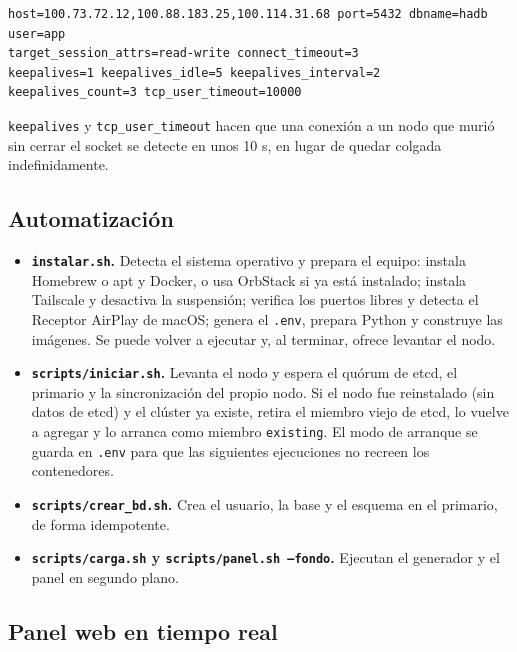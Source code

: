 \documentclass[11pt,a4paper]{article}
\newcommand{\cod}[1]{\texttt{#1}}
\begin{document}
\begin{lstlisting}
host=100.73.72.12,100.88.183.25,100.114.31.68 port=5432 dbname=hadb user=app
target_session_attrs=read-write connect_timeout=3
keepalives=1 keepalives_idle=5 keepalives_interval=2 keepalives_count=3 tcp_user_timeout=10000
\end{lstlisting}

\cod{keepalives} y \cod{tcp\_user\_timeout} hacen que una conexión a un nodo que murió sin cerrar el socket se detecte en unos 10 s, en lugar de quedar colgada indefinidamente.

\subsection{Automatización}

\begin{itemize}
  \item \textbf{\cod{instalar.sh}.} Detecta el sistema operativo y prepara el equipo: instala Homebrew o apt y Docker, o usa OrbStack si ya está instalado; instala Tailscale y desactiva la suspensión; verifica los puertos libres y detecta el Receptor AirPlay de macOS; genera el \cod{.env}, prepara Python y construye las imágenes. Se puede volver a ejecutar y, al terminar, ofrece levantar el nodo.
  \item \textbf{\cod{scripts/iniciar.sh}.} Levanta el nodo y espera el quórum de etcd, el primario y la sincronización del propio nodo. Si el nodo fue reinstalado (sin datos de etcd) y el clúster ya existe, retira el miembro viejo de etcd, lo vuelve a agregar y lo arranca como miembro \cod{existing}. El modo de arranque se guarda en \cod{.env} para que las siguientes ejecuciones no recreen los contenedores.
  \item \textbf{\cod{scripts/crear\_bd.sh}.} Crea el usuario, la base y el esquema en el primario, de forma idempotente.
  \item \textbf{\cod{scripts/carga.sh} y \cod{scripts/panel.sh --fondo}.} Ejecutan el generador y el panel en segundo plano.
\end{itemize}

\subsection{Panel web en tiempo real}
\end{document}
